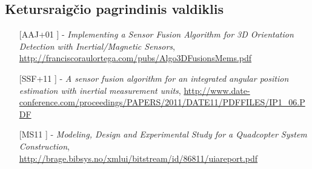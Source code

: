 \documentclass[12pt, a4paper, lithuanian, final]{article}
\begin{document}
\subsection{Ketursraigčio pagrindinis valdiklis}





\begin{itemize}%
	\item [[AAJ+01]] - \textit{Implementing a Sensor Fusion Algorithm for 3D Orientation Detection with Inertial/Magnetic Sensors}, \url{http://franciscoraulortega.com/pubs/Algo3DFusionsMems.pdf}
	\item [[SSF+11]] - \textit{A sensor fusion algorithm for an integrated angular position estimation with inertial measurement units}, \url{http://www.date-conference.com/proceedings/PAPERS/2011/DATE11/PDFFILES/IP1_06.PDF}
	\item [[MS11]] - \textit{Modeling, Design and Experimental Study for a Quadcopter System Construction}, \url{http://brage.bibsys.no/xmlui/bitstream/id/86811/uiareport.pdf}
\end{itemize}
\end{document}
